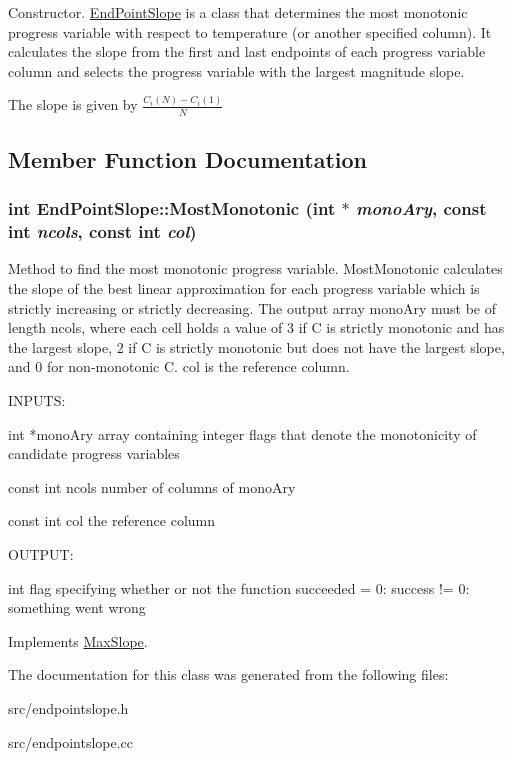 Constructor. \hyperlink{classEndPointSlope}{EndPointSlope} is a class that determines the most monotonic progress variable with respect to temperature (or another specified column). It calculates the slope from the first and last endpoints of each progress variable column and selects the progress variable with the largest magnitude slope.

The slope is given by $ \frac{C_i(N) - C_i(1)}{N} $ 

\subsection{Member Function Documentation}
\hypertarget{classEndPointSlope_a70417721fe8a60669a67d19a7855bef5}{
\subsubsection[{MostMonotonic}]{\setlength{\rightskip}{0pt plus 5cm}int EndPointSlope::MostMonotonic (int $\ast$ {\em monoAry}, \/  const int {\em ncols}, \/  const int {\em col})}}
\label{da/d7d/classEndPointSlope_a70417721fe8a60669a67d19a7855bef5}


Method to find the most monotonic progress variable. MostMonotonic calculates the slope of the best linear approximation for each progress variable which is strictly increasing or strictly decreasing. The output array monoAry must be of length ncols, where each cell holds a value of 3 if C is strictly monotonic and has the largest slope, 2 if C is strictly monotonic but does not have the largest slope, and 0 for non-\/monotonic C. col is the reference column.

\begin{DoxyVerb}
INPUTS:

int *monoAry       array containing integer flags that denote the monotonicity of candidate progress variables

const int ncols    number of columns of monoAry

const int col      the reference column

OUTPUT:

int                flag specifying whether or not the function succeeded 
                    = 0: success
		   != 0: something went wrong 
\end{DoxyVerb}
 

Implements \hyperlink{classMaxSlope_a494b1b1ae073d3b29fe7cdc023ce7861}{MaxSlope}.

The documentation for this class was generated from the following files:\begin{DoxyCompactItemize}
\item 
src/endpointslope.h\item 
src/endpointslope.cc\end{DoxyCompactItemize}
